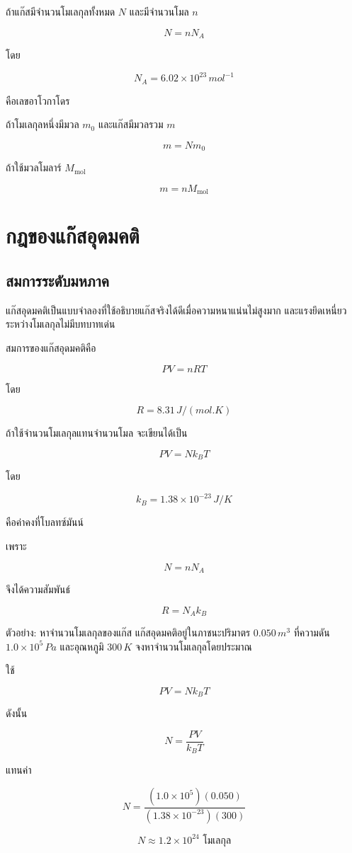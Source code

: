 ถ้าแก๊สมีจำนวนโมเลกุลทั้งหมด $N$ และมีจำนวนโมล $n$

\[
N=nN_A
\]

โดย

\[
N_A=6.02\times10^{23}\,\si{mol^{-1}}
\]

คือเลขอาโวกาโดร

ถ้าโมเลกุลหนึ่งมีมวล $m_0$ และแก๊สมีมวลรวม $m$

\[
m=Nm_0
\]

ถ้าใช้มวลโมลาร์ $M_{\text{mol}}$

\[
m=nM_{\text{mol}}
\]

\section{กฎของแก๊สอุดมคติ}

\subsection{สมการระดับมหภาค}

แก๊สอุดมคติเป็นแบบจำลองที่ใช้อธิบายแก๊สจริงได้ดีเมื่อความหนาแน่นไม่สูงมาก และแรงยึดเหนี่ยวระหว่างโมเลกุลไม่มีบทบาทเด่น

สมการของแก๊สอุดมคติคือ

\[
\boxed{PV=nRT}
\]

โดย

\[
R=8.31\,\si{J/(mol.K)}
\]

ถ้าใช้จำนวนโมเลกุลแทนจำนวนโมล จะเขียนได้เป็น

\[
\boxed{PV=Nk_BT}
\]

โดย

\[
k_B=1.38\times10^{-23}\,\si{J/K}
\]

คือค่าคงที่โบลทซ์มันน์

เพราะ

\[
N=nN_A
\]

จึงได้ความสัมพันธ์

\[
\boxed{R=N_Ak_B}
\]

\begin{examplebox}{ตัวอย่าง: หาจำนวนโมเลกุลของแก๊ส}
แก๊สอุดมคติอยู่ในภาชนะปริมาตร $0.050\,\si{m^3}$ ที่ความดัน $1.0\times10^5\,\si{Pa}$ และอุณหภูมิ $300\,\si{K}$ จงหาจำนวนโมเลกุลโดยประมาณ

ใช้

\[
PV=Nk_BT
\]

ดังนั้น

\[
N=\frac{PV}{k_BT}
\]

แทนค่า

\[
N=\frac{(1.0\times10^5)(0.050)}{(1.38\times10^{-23})(300)}
\]

\[
\boxed{N\approx1.2\times10^{24}\text{ โมเลกุล}}
\]
\end{examplebox}

